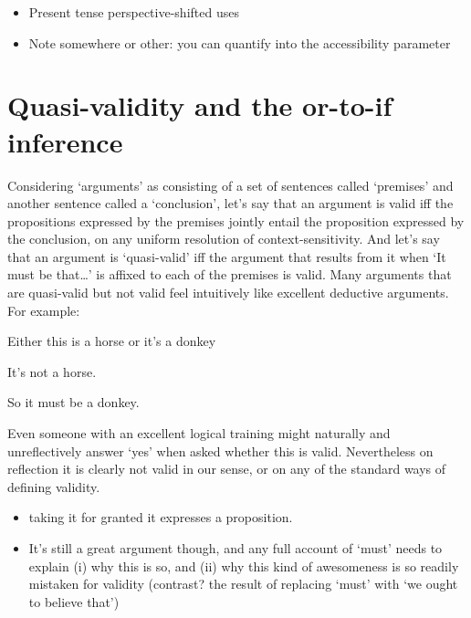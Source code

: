 \documentclass[If.tex]{subfiles}
\begin{document}
\begin{itemize}
	\item
	Present tense perspective-shifted uses
	\item
	Note somewhere or other: you can quantify into the accessibility parameter 
\end{itemize}

\section{Quasi-validity and the or-to-if inference}
\label{sect:quasivalidity}
Considering ‘arguments’ as consisting of a set of sentences called ‘premises’ and another sentence called a ‘conclusion’, let's say that an argument is valid iff the propositions expressed by the premises jointly entail the proposition expressed by the conclusion, on any uniform resolution of context-sensitivity. And let's say that an argument is ‘quasi-valid’ iff the argument that results from it when ‘It must be that\ldots{}’ is affixed to each of the premises is valid. Many arguments that are quasi-valid but not valid feel intuitively like excellent deductive arguments. For example:
\begin{prop}
	\nitem \label{eithermust}
		Either this is a horse or it's a donkey

		It's not a horse.

		So it must be a donkey.
\end{prop}
Even someone with an excellent logical training might naturally and unreflectively answer ‘yes’ when asked whether this is valid. Nevertheless on reflection it is clearly not valid in our sense, or on any of the standard ways of defining validity.

\begin{itemize} 
	\item
	taking it for granted it expresses a proposition. 
	\item
	It's still a great argument though, and any full account of ‘must’ needs to explain (i) why this is so, and (ii) why this kind of awesomeness is so readily mistaken for validity (contrast? the result of replacing ‘must’ with ‘we ought to believe that’) 
\end{itemize}
\end{document}
